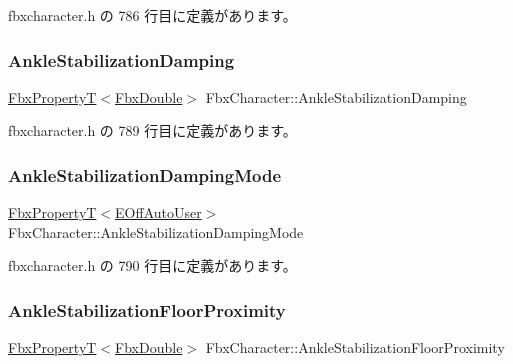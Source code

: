  fbxcharacter.\+h の 786 行目に定義があります。

\mbox{\label{class_fbx_character_afe32df055c5f04d1c327e42e301ffdbb}} 
\subsubsection{\texorpdfstring{Ankle\+Stabilization\+Damping}{AnkleStabilizationDamping}}
{\footnotesize\ttfamily \hyperlink{class_fbx_property_t}{Fbx\+PropertyT}$<$\hyperlink{fbxtypes_8h_a171e72a1c46fc15c1a6c9c31948c1c5b}{Fbx\+Double}$>$ Fbx\+Character\+::\+Ankle\+Stabilization\+Damping}



 fbxcharacter.\+h の 789 行目に定義があります。

\mbox{\label{class_fbx_character_aea0449cedae7259bd1e9afd213fcdf4b}} 
\subsubsection{\texorpdfstring{Ankle\+Stabilization\+Damping\+Mode}{AnkleStabilizationDampingMode}}
{\footnotesize\ttfamily \hyperlink{class_fbx_property_t}{Fbx\+PropertyT}$<$\hyperlink{class_fbx_character_ab698a180e6f900ba8317257749c2ecce}{E\+Off\+Auto\+User}$>$ Fbx\+Character\+::\+Ankle\+Stabilization\+Damping\+Mode}



 fbxcharacter.\+h の 790 行目に定義があります。

\mbox{\label{class_fbx_character_aab4dcde4d515e2f489d7bbddbfa50460}} 
\subsubsection{\texorpdfstring{Ankle\+Stabilization\+Floor\+Proximity}{AnkleStabilizationFloorProximity}}
{\footnotesize\ttfamily \hyperlink{class_fbx_property_t}{Fbx\+PropertyT}$<$\hyperlink{fbxtypes_8h_a171e72a1c46fc15c1a6c9c31948c1c5b}{Fbx\+Double}$>$ Fbx\+Character\+::\+Ankle\+Stabilization\+Floor\+Proximity}



